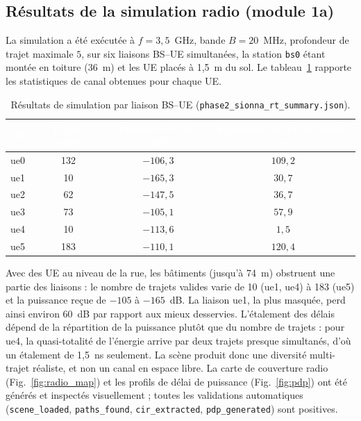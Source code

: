 \documentclass[12pt,a4paper,titlepage]{article}
\newcommand{\hd}[1]{\textcolor{white}{\textbf{#1}}}
\begin{document}
\subsection{Résultats de la simulation radio (module 1a)}
\label{subsec:res_phase2}

La simulation a été exécutée à $f = 3{,}5$~GHz, bande $B = 20$~MHz, profondeur de trajet maximale $5$, sur six liaisons BS--UE simultanées, la station \texttt{bs0} étant montée en toiture (36~m) et les UE placés à 1,5~m du sol. Le tableau~\ref{tab:res_phase2} rapporte les statistiques de canal obtenues pour chaque UE.

\begin{table}[H]
    \centering
    \caption{Résultats de simulation par liaison BS--UE (\texttt{phase2\_sionna\_rt\_summary.json}).}
    \label{tab:res_phase2}
    \begin{tabular}{lccc}
        \toprule
        \rowcolor{tabhead}
        \hd{UE} & \hd{Trajets valides} & \hd{Puissance totale (dB)} & \hd{Étalement RMS des délais (ns)} \\
        \midrule
        ue0 & 132 & $-106{,}3$ & $109{,}2$ \\
        ue1 & 10  & $-165{,}3$ & $30{,}7$ \\
        ue2 & 62  & $-147{,}5$ & $36{,}7$ \\
        ue3 & 73  & $-105{,}1$ & $57{,}9$ \\
        ue4 & 10  & $-113{,}6$ & $1{,}5$ \\
        ue5 & 183 & $-110{,}1$ & $120{,}4$ \\
        \bottomrule
    \end{tabular}
\end{table}

Avec des UE au niveau de la rue, les bâtiments (jusqu'à 74~m) obstruent une partie des liaisons : le nombre de trajets valides varie de 10 (ue1, ue4) à 183 (ue5) et la puissance reçue de $-105$ à $-165$~dB. La liaison ue1, la plus masquée, perd ainsi environ 60~dB par rapport aux mieux desservies. L'étalement des délais dépend de la répartition de la puissance plutôt que du nombre de trajets : pour ue4, la quasi-totalité de l'énergie arrive par deux trajets presque simultanés, d'où un étalement de 1,5~ns seulement. La scène produit donc une diversité multi-trajet réaliste, et non un canal en espace libre. La carte de couverture radio (Fig.~\ref{fig:radio_map}) et les profils de délai de puissance (Fig.~\ref{fig:pdp}) ont été générés et inspectés visuellement ; toutes les validations automatiques (\texttt{scene\_loaded}, \texttt{paths\_found}, \texttt{cir\_extracted}, \texttt{pdp\_generated}) sont positives.
\end{document}
